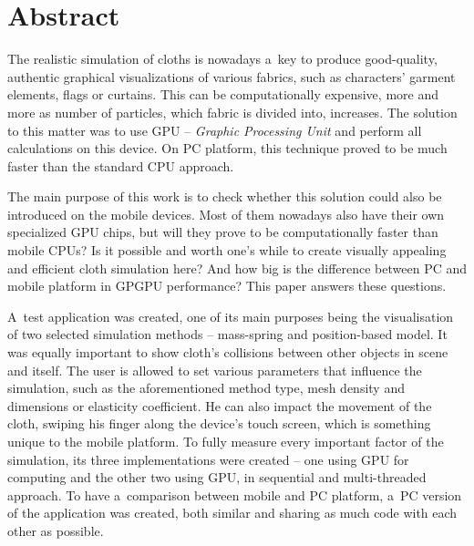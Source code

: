 \chapter*{Abstract}


The realistic simulation of cloths is nowadays a~key to produce good-quality, authentic graphical visualizations of various fabrics, such as characters' garment elements, flags or curtains. This can be computationally expensive, more and more as number of particles, which fabric is divided into, increases. The solution to this matter was to use GPU -- \emph{Graphic Processing Unit} and perform all calculations on this device. On PC platform, this technique proved to be much faster than the standard CPU approach.

The main purpose of this work is to check whether this solution could also be introduced on the mobile devices. Most of them nowadays also have their own specialized GPU chips, but will they prove to be computationally faster than mobile CPUs? Is it possible and worth one's while to create visually appealing and efficient cloth simulation here? And how big is the difference between PC and mobile platform in GPGPU performance? This paper answers these questions.

A~test application was created, one of its main purposes being the visualisation of two selected simulation methods -- mass-spring and position-based model. It was equally important to show cloth's collisions between other objects in scene and itself. The user is allowed to set various parameters that influence the simulation, such as the aforementioned method type, mesh density and dimensions or elasticity coefficient. He can also impact the movement of the cloth, swiping his finger along the device's touch screen, which is something unique to the mobile platform. To fully measure every important factor of the simulation, its three implementations were created -- one using GPU for computing and the other two using GPU, in sequential and multi-threaded approach. To have a~comparison between mobile and PC platform, a~PC version of the application was created, both similar and sharing as much code with each other as possible.

